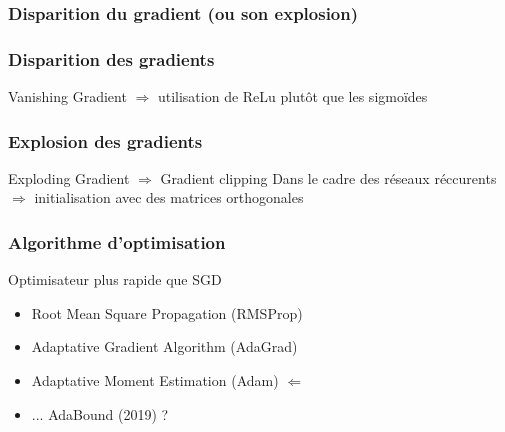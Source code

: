\begin{frame}
  \frametitle{Disparition du gradient (ou son explosion)}
\end{frame}

\begin{frame}
  \frametitle{Disparition des gradients}
  Vanishing Gradient $\Rightarrow$ utilisation de ReLu plutôt que les sigmoïdes
\end{frame}

\begin{frame}
  \frametitle{Explosion des gradients}
  Exploding Gradient $\Rightarrow$ Gradient clipping
  Dans le cadre des réseaux réccurents $\Rightarrow$ initialisation avec des matrices orthogonales
\end{frame}

\begin{frame}
  \frametitle{Algorithme d'optimisation}
  Optimisateur plus rapide que SGD
  \begin{itemize}
  \item Root Mean Square Propagation (RMSProp)
  \item Adaptative Gradient Algorithm (AdaGrad)
  \item Adaptative Moment Estimation (Adam)    $\Leftarrow$
  \item ... AdaBound (2019) ?
 \end{itemize}
\end{frame}
